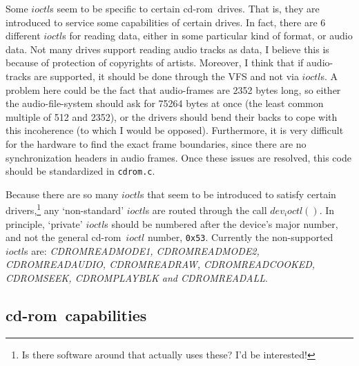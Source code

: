 \documentclass{article}
\def\cdrom{{\sc cd-rom}}
\def\cdromc{{\tt {cdrom.c}}}
\begin{document}
Some $ioctl$s seem to be specific to certain \cdrom\ drives. That is,
they are introduced to service some capabilities of certain drives. In
fact, there are 6 different $ioctl$s for reading data, either in some
particular kind of format, or audio data. Not many drives support
reading audio tracks as data, I believe this is because of protection
of copyrights of artists. Moreover, I think that if audio-tracks are
supported, it should be done through the VFS and not via $ioctl$s. A
problem here could be the fact that audio-frames are 2352 bytes long,
so either the audio-file-system should ask for 75264 bytes at once
(the least common multiple of 512 and 2352), or the drivers should
bend their backs to cope with this incoherence (to which I would be
opposed).  Furthermore, it is very difficult for the hardware to find
the exact frame boundaries, since there are no synchronization headers
in audio frames.  Once these issues are resolved, this code should be
standardized in \cdromc.

Because there are so many $ioctl$s that seem to be introduced to
satisfy certain drivers,\footnote{Is there software around that
  actually uses these? I'd be interested!} any `non-standard' $ioctl$s
are routed through the call $dev_ioctl()$. In principle, `private'
$ioctl$s should be numbered after the device's major number, and not
the general \cdrom\ $ioctl$ number, {\tt {0x53}}. Currently the
non-supported $ioctl$s are: {\it CDROMREADMODE1, CDROMREADMODE2,
  CDROMREADAUDIO, CDROMREADRAW, CDROMREADCOOKED, CDROMSEEK,
  CDROMPLAY\-BLK and CDROM\-READALL}.

\subsection{\cdrom\ capabilities}
\end{document}
